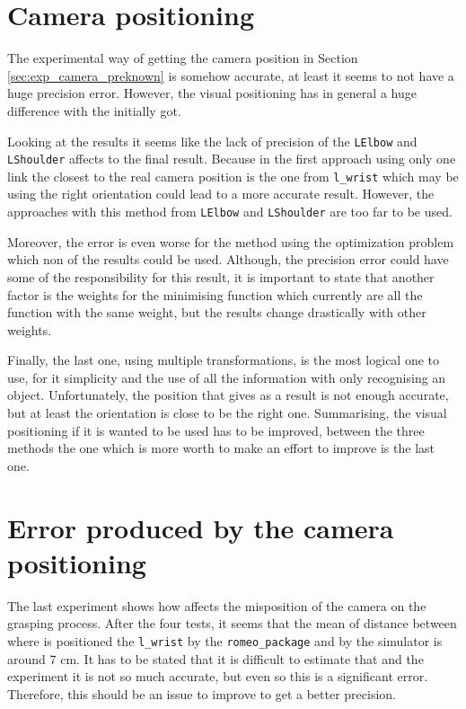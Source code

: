 \documentclass[12pt,a4paper,final,twoside,openright]{report}
\begin{document}
\section{Camera positioning}

The experimental way of getting the camera position in Section \ref{sec:exp_camera_preknown} is somehow accurate, at least it seems to not have a huge precision error. However, the visual positioning has in general a huge difference with the initially got. 

Looking at the results it seems like the lack of precision of the \texttt{LElbow} and \texttt{LShoulder} affects to the final result. Because in the first approach using only one link the closest to the real camera position is the one from \texttt{l\_wrist} which may be using the right orientation could lead to a more accurate result. However, the approaches with this method from \texttt{LElbow} and \texttt{LShoulder} are too far to be used. 

Moreover, the error is even worse for the method using the optimization problem which non of the results could be used. Although, the precision error could have some of the responsibility for this result, it is important to state that another factor is the weights for the minimising function which currently are all the function with the same weight, but the results change drastically with other weights.

Finally, the last one, using multiple transformations, is the most logical one to use, for it simplicity and the use of all the information with only recognising an object. Unfortunately, the position that gives as a result is not enough accurate, but at least the orientation is close to be the right one. Summarising, the visual positioning if it is wanted to be used has to be improved, between the three methods the one which is more worth to make an effort to improve is the last one.

\section{Error produced by the camera positioning} 

The last experiment shows how affects the misposition of the camera on the grasping process. After the four tests, it seems that the mean of distance between where is positioned the \texttt{l\_wrist} by the \texttt{romeo\_package} and by the simulator is around 7 cm. It has to be stated that it is difficult to estimate that and the experiment it is not so much accurate, but even so this is a significant error. Therefore, this should be an issue to improve to get a better precision.
\end{document}

